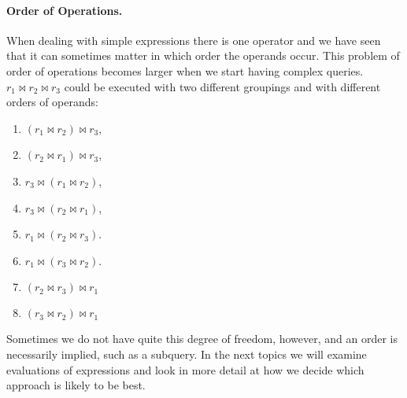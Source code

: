 \paragraph{Order of Operations.} When dealing with simple expressions there is one operator and we have seen that it can sometimes matter in which order the operands occur. This problem of order of operations becomes larger when we start having complex queries. $r_{1} \bowtie r_{2} \bowtie r_{3}$ could be executed with two different groupings and with different orders of operands: 
\begin{enumerate}
\item $(r_{1} \bowtie r_{2}) \bowtie r_{3}$,  
\item $(r_{2} \bowtie r_{1}) \bowtie r_{3}$, 
\item $r_{3} \bowtie (r_{1} \bowtie r_{2})$,
\item $r_{3} \bowtie (r_{2} \bowtie r_{1})$,
\item $r_{1} \bowtie (r_{2} \bowtie r_{3})$. 
\item $r_{1} \bowtie (r_{3} \bowtie r_{2})$. 
\item $(r_{2} \bowtie r_{3}) \bowtie r_{1}$
\item $(r_{3} \bowtie r_{2}) \bowtie r_{1}$
\end{enumerate}

Sometimes we do not have quite this degree of freedom, however, and an order is necessarily implied, such as a subquery. In the next topics we will examine evaluations of expressions and look in more detail at how we decide which approach is likely to be best.





